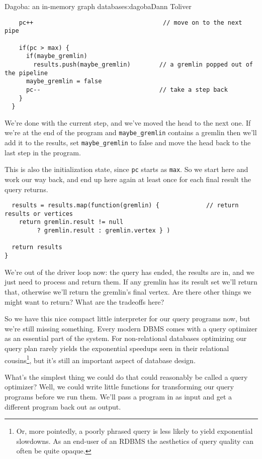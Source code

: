 \begin{aosachapter}{Dagoba: an in-memory graph database}{s:dagoba}{Dann Toliver}
\begin{verbatim}
    pc++                                    // move on to the next pipe
    
    if(pc > max) {
      if(maybe_gremlin)
        results.push(maybe_gremlin)        // a gremlin popped out of the pipeline
      maybe_gremlin = false
      pc--                                 // take a step back
    }
  }
\end{verbatim}

We're done with the current step, and we've moved the head to the next
one. If we're at the end of the program and \texttt{maybe\_gremlin}
contains a gremlin then we'll add it to the results, set
\texttt{maybe\_gremlin} to false and move the head back to the last step
in the program.

This is also the initialization state, since \texttt{pc} starts as
\texttt{max}. So we start here and work our way back, and end up here
again at least once for each final result the query returns.

\begin{verbatim}
  results = results.map(function(gremlin) {             // return results or vertices
    return gremlin.result != null 
         ? gremlin.result : gremlin.vertex } )

  return results
}
\end{verbatim}

We're out of the driver loop now: the query has ended, the results are
in, and we just need to process and return them. If any gremlin has its
result set we'll return that, otherwise we'll return the gremlin's final
vertex. Are there other things we might want to return? What are the
tradeoffs here?

\label{query-transformers}

So we have this nice compact little interpreter for our query programs
now, but we're still missing something. Every modern DBMS comes with a
query optimizer as an essential part of the system. For non-relational
databases optimizing our query plan rarely yields the exponential
speedups seen in their relational cousins\footnote{Or, more pointedly, a
  poorly phrased query is less likely to yield exponential slowdowns. As
  an end-user of an RDBMS the aesthetics of query quality can often be
  quite opaque.}, but it's still an important aspect of database design.

What's the simplest thing we could do that could reasonably be called a
query optimizer? Well, we could write little functions for transforming
our query programs before we run them. We'll pass a program in as input
and get a different program back out as output.


\end{aosachapter}
